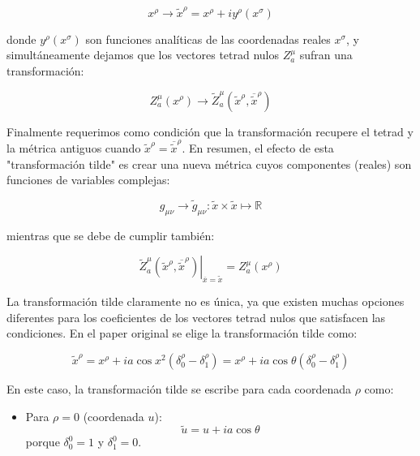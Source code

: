 \begin{enumerate}[1.]
          \begin{equation}
              x^\rho \rightarrow \tilde{x}^\rho = x^\rho + i y^\rho(x^\sigma)
          \end{equation}

          donde $y^\rho(x^\sigma)$ son funciones analíticas de las coordenadas reales $x^\sigma$, y simultáneamente dejamos que los vectores tetrad nulos $Z_a^\mu$ sufran una transformación:

          \begin{equation}
              Z_a^\mu(x^\rho) \rightarrow \tilde{Z}_a^\mu(\tilde{x}^\rho, \overline{\tilde{x}}^\rho)
          \end{equation}

          Finalmente requerimos como condición que la transformación recupere el tetrad y la métrica antiguos cuando $\tilde{x}^\rho = \overline{\tilde{x}}^\rho$. En resumen, el efecto de esta "transformación tilde" es crear una nueva métrica cuyos componentes (reales) son funciones de variables complejas:

          \begin{equation}
              g_{\mu \nu} \rightarrow \tilde{g}_{\mu \nu}: \tilde{x} \times \tilde{x} \mapsto \mathbb{R}
          \end{equation}

          mientras que se debe de cumplir también:

          \begin{equation}
              \left. \tilde{Z}_a^\mu(\tilde{x}^\rho, \overline{\tilde{x}}^\rho) \right|_{\overline{x} = \tilde{x}} = Z_a^\mu(x^\rho)
          \end{equation}

          La transformación tilde claramente no es única, ya que existen muchas opciones diferentes para los coeficientes de los vectores tetrad nulos que satisfacen las condiciones. En el paper original \cite{newman-1965} se elige la transformación tilde como:

          \begin{equation}
              \tilde{x}^\rho = x^\rho + i a \cos x^2 (\delta_0^\rho - \delta_1^\rho) = x^\rho + i a \cos \theta (\delta_0^\rho - \delta_1^\rho)
          \end{equation}

          En este caso, la transformación tilde se escribe para cada coordenada $\rho$ como:

          \begin{itemize}
              \item Para $\rho = 0$ (coordenada $u$):
                    \begin{equation}
                        \tilde{u} = u + i a \cos \theta
                    \end{equation}
                    porque $\delta_0^0 = 1$ y $\delta_1^0 = 0$.


\end{itemize}
\end{enumerate}
